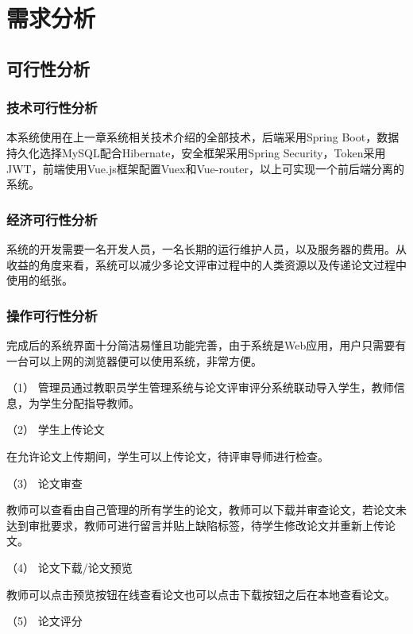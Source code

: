 
\chapter{需求分析}
\label{需求分析}

\section{可行性分析}

\subsection{技术可行性分析}

本系统使用在上一章系统相关技术介绍的全部技术，后端采用Spring Boot，数据持久化选择MySQL配合Hibernate，安全框架采用Spring Security，Token采用JWT，前端使用Vue.js框架配置Vuex和Vue-router，以上可实现一个前后端分离的系统。

\subsection{经济可行性分析}

系统的开发需要一名开发人员，一名长期的运行维护人员，以及服务器的费用。从收益的角度来看，系统可以减少多论文评审过程中的人类资源以及传递论文过程中使用的纸张。

\subsection{操作可行性分析}

完成后的系统界面十分简洁易懂且功能完善，由于系统是Web应用，用户只需要有一台可以上网的浏览器便可以使用系统，非常方便。


（1） 管理员通过教职员学生管理系统与论文评审评分系统联动导入学生，教师信息，为学生分配指导教师。

（2） 学生上传论文

在允许论文上传期间，学生可以上传论文，待评审导师进行检查。

（3） 论文审查

教师可以查看由自己管理的所有学生的论文，教师可以下载并审查论文，若论文未达到审批要求，教师可进行留言并贴上缺陷标签，待学生修改论文并重新上传论文。

（4） 论文下载/论文预览

教师可以点击预览按钮在线查看论文也可以点击下载按钮之后在本地查看论文。

（5） 论文评分

